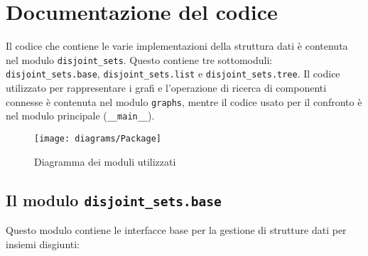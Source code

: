 \section{Documentazione del codice}
Il codice che contiene le varie implementazioni della struttura dati è
contenuta nel modulo \texttt{disjoint\_sets}. Questo contiene tre sottomoduli: \linebreak
\texttt{disjoint\_sets.base}, \texttt{disjoint\_sets.list} e \texttt{disjoint\_sets.tree}.
Il codice utilizzato per rappresentare i grafi e l'operazione di ricerca di componenti
connesse è contenuta nel modulo \texttt{graphs}, mentre il codice usato per il confronto
è nel modulo principale (\texttt{\_\_main\_\_}).

\begin{figure}[!h]
      \centering
      \texttt{[image: diagrams/Package]}
      \caption{Diagramma dei moduli utilizzati}
\end{figure}


\subsection{Il modulo \texttt{disjoint\_sets.base}}
Questo modulo contiene le interfacce base per la gestione di
strutture dati per insiemi disgiunti:

